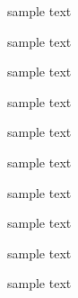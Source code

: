 \tiny sample text

\scriptsize sample text

\footnotesize sample text

\small sample text

\normalsize sample text

\large sample text

\Large sample text

\LARGE sample text

\huge sample text

\Huge sample text
